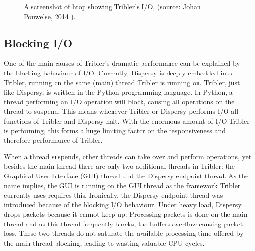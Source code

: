 \begin{figure}[!h]
	\caption{A screenshot of htop showing Tribler's I/O, (source: Johan Pouwelse, 2014 \cite{pouwelse2014reduce}).}
	\label{fig:iotop_tribler_april_2014}
\end{figure}

\subsection{Blocking I/O}
One of the main causes of Tribler's dramatic performance can be explained by the blocking behaviour of I/O.
Currently, Dispersy is deeply embedded into Tribler, running on the same (main) thread Tribler is running on.
Tribler, just like Dispersy, is written in the Python programming language.
In Python, a thread performing an I/O operation will block, causing all operations on the thread to suspend.
This means whenever Tribler or Dispersy performs I/O all functions of Tribler and Dispersy halt.
With the enormous amount of I/O Tribler is performing, this forms a huge limiting factor on the responsiveness and therefore performance of Tribler.

When a thread suspends, other threads can take over and perform operations, yet besides the main thread there are only two additional threads in Tribler: the Graphical User Interface (GUI) thread and the Dispersy endpoint thread.
As the name implies, the GUI is running on the GUI thread as the framework Tribler currently uses requires this.
Ironically, the Dispersy endpoint thread was introduced because of the blocking I/O behaviour.
Under heavy load, Dispersy drops packets because it cannot keep up.
Processing packets is done on the main thread and as this thread frequently blocks, the buffers overflow causing packet loss.
These two threads do not saturate the available processing time offered by the main thread blocking, leading to wasting valuable CPU cycles.

